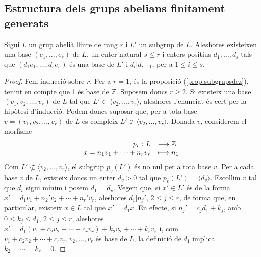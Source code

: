 \documentclass[../main.tex]{subfiles}
\begin{document}
\subsection{Estructura dels grups abelians finitament generats}
\begin{prop}\label{prop:existenciadeunabase}
Sigui $L$ un grup abelià lliure de rang $r$ i $L'$ un subgrup de $L$. Aleshores existeixen una base $(e_1,\ldots,e_r)$ de $L$, un enter natural $s\leq r$ i enters positius $d_1,\ldots,d_s$ tals que $(d_1e_1,\ldots,d_se_s)$ és una base de $L'$ i $d_i|d_{i+1}$, per a $1\leq i\leq s$.
\end{prop}
\begin{proof}
Fem inducció sobre $r$. Per a $r = 1$, és la proposició (\ref{prop:subgrupsdez}), tenint en compte que 1 és base de $\mathbb{Z}$. Suposem doncs $r\geq 2$. Si existeix una base $(v_1,v_2,\ldots,v_r)$ de $L$ tal que $L'\subset \langle v_2,\ldots,v_r\rangle$, aleshores l'enunciat és cert per la hipòtesi d'inducció. Podem doncs suposar que, per a tota base $v = (v_1,v_2,\ldots,v_r)$ de $L$ es compleix $L'\not\subset\langle v_2,\ldots,v_r\rangle$. Donada $v$, considerem el morfisme
\begin{equation}
    \notag
    \begin{array}{rl}
        p_v: L & \longrightarrow \mathbb{Z} \\
        x = n_1v_1+\cdots+n_rv_r & \longmapsto n_1
    \end{array}
\end{equation}
Com $L'\not\subset \langle v_2,\ldots,v_r\rangle$, el subgrup $p_v(L')$ és no nul per a tota base $v$. Per a cada base $v$ de $L$, existeix doncs un enter $d_v>0$ tal que $p_v(L') = \langle d_v\rangle$. Escollim $v$ tal que $d_v$ sigui mínim i posem $d_1 = d_v$. Vegem que, si $x'\in L'$ és de la forma $x' = d_1v_1 + n_2'v_2+\cdots+n_r'v_r$, aleshores $d_1|n_j'$, $2\leq j\leq r$, de forma que, en particular, existeix $x\in L$ tal que $x'=d_1x$. En efecte, si $n_j' = c_jd_1+k_j$, amb $0\leq k_j\leq d_1$, $2\leq j\leq r$, aleshores $x' = d_1(v_1+c_2v_2+\cdots+c_rv_r)+k_2v_2+\cdots+k_rv_r$ i, com $v_1+c_2v_2+\cdots+c_rv_r,v_2,\ldots,v_r$ és base de $L$, la definició de $d_1$ implica $k_2 = \cdots = k_r = 0$.


\end{proof}
\end{document}
